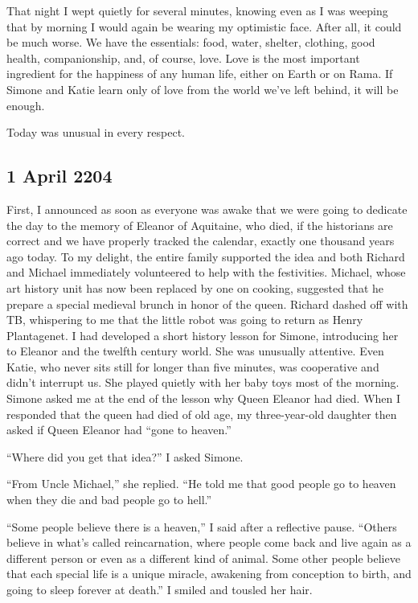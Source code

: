 \documentclass[]{article}
\begin{document}
That night I wept quietly for several minutes, knowing even as I was weeping that by morning I would again be wearing my optimistic face. After all, it could be much worse. We have the essentials: food, water, shelter, clothing, good health, companionship, and, of course, love. Love is the most important ingredient for the happiness of any human life, either on Earth or on Rama. If Simone and Katie learn only of love from the world we’ve left behind, it will be enough.

Today was unusual in every respect.

\subsection{1 April 2204}

First, I announced as soon as everyone was awake that we were going to dedicate the day to the memory of Eleanor of Aquitaine, who died, if the historians are correct and we have properly tracked the calendar, exactly one thousand years ago today. To my delight, the entire family supported the idea and both Richard and Michael immediately volunteered to help with the festivities. Michael, whose art history unit has now been replaced by one on cooking, suggested that he prepare a special medieval brunch in honor of the queen. Richard dashed off with TB, whispering to me that the little robot was going to return as Henry Plantagenet. I had developed a short history lesson for Simone, introducing her to Eleanor and the twelfth century world. She was unusually attentive. Even Katie, who never sits still for longer than five minutes, was cooperative and didn’t interrupt us. She played quietly with her baby toys most of the morning. Simone asked me at the end of the lesson why Queen Eleanor had died. When I responded that the queen had died of old age, my three-year-old daughter then asked if Queen Eleanor had “gone to heaven.”

“Where did you get that idea?” I asked Simone.

“From Uncle Michael,” she replied. “He told me that good people go to heaven when they die and bad people go to hell.”

“Some people believe there is a heaven,” I said after a reflective pause. “Others believe in what’s called reincarnation, where people come back and live again as a different person or even as a different kind of animal. Some other people believe that each special life is a unique miracle, awakening from conception to birth, and going to sleep forever at death.” I smiled and tousled her hair.
\end{document}
